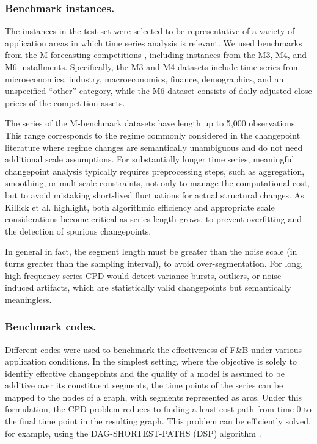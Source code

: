 \documentclass[runningheads]{llncs}
\begin{document}
\subsubsection{Benchmark instances.} 
The instances in the test set were selected to be representative of a variety of application areas in which time series analysis is relevant. We used benchmarks from the M forecasting competitions \cite{M26}, including instances from the M3, M4, and M6 installments. Specifically, the M3 and M4 datasets include time series from microeconomics, industry, macroeconomics, finance, demographics, and an unspecified “other” category, while the M6 dataset consists of daily adjusted close prices of the competition assets.

The series of the M-benchmark datasets have length up to 5,000 observations. This range corresponds to the regime commonly considered in the changepoint literature where regime changes are semantically unambiguous and do not need additional scale assumptions. For substantially longer time series, meaningful changepoint analysis typically requires preprocessing steps, such as aggregation, smoothing, or multiscale constraints, not only to manage the computational cost, but to avoid mistaking short-lived fluctuations for actual structural changes.  As Killick et al. \cite{KFE12} highlight, both algorithmic efficiency and appropriate scale considerations become critical as series length grows, to prevent overfitting and the detection of spurious changepoints. 

In general in fact, the segment length must be greater than the noise scale (in turns greater than the sampling interval), to avoid over-segmentation. For long, high-frequency series CPD would detect variance bursts, outliers, or noise-induced artifacts, which are statistically valid changepoints but semantically meaningless.

\subsubsection{Benchmark codes.}
Different codes were used to benchmark the effectiveness of F\&B under various application conditions. In the simplest setting, where the objective is solely to identify effective changepoints and the quality of a model is assumed to be additive over its constituent segments, the time points of the series can be mapped to the nodes of a graph, with segments represented as arcs. Under this formulation, the CPD problem reduces to finding a least-cost path from time 0 to the final time point in the resulting graph. This problem can be efficiently solved, for example, using the DAG-SHORTEST-PATHS (DSP) algorithm \cite{CLRS09}.
\end{document}
